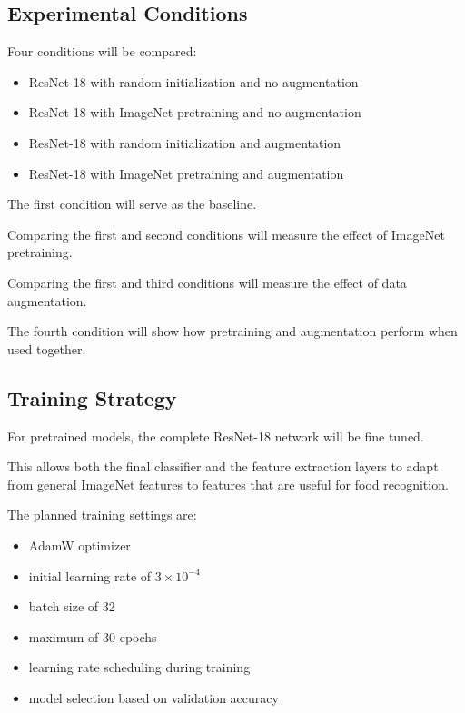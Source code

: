 \documentclass[11pt,a4paper]{article}
\begin{document}
\subsection{Experimental Conditions}

Four conditions will be compared:

\begin{itemize}
    \item ResNet-18 with random initialization and no augmentation
    \item ResNet-18 with ImageNet pretraining and no augmentation
    \item ResNet-18 with random initialization and augmentation
    \item ResNet-18 with ImageNet pretraining and augmentation
\end{itemize}

The first condition will serve as the baseline.

Comparing the first and second conditions will measure the effect of ImageNet
pretraining.

Comparing the first and third conditions will measure the effect of data augmentation.

The fourth condition will show how pretraining and augmentation perform when used
together.

\subsection{Training Strategy}

For pretrained models, the complete ResNet-18 network will be fine tuned.

This allows both the final classifier and the feature extraction layers to adapt from
general ImageNet features to features that are useful for food recognition.

The planned training settings are:

\begin{itemize}
    \item AdamW optimizer
    \item initial learning rate of $3 \times 10^{-4}$
    \item batch size of 32
    \item maximum of 30 epochs
    \item learning rate scheduling during training
    \item model selection based on validation accuracy
\end{itemize}
\end{document}
